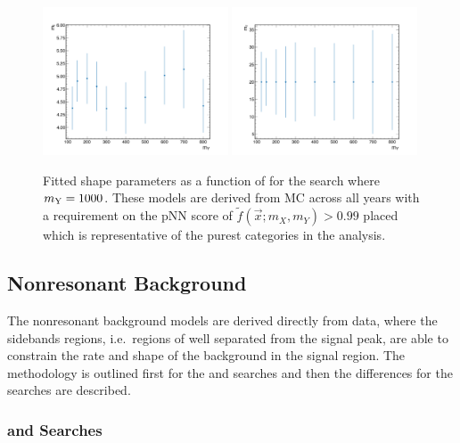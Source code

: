 \begin{figure}
  \includegraphics[width=0.49\textwidth]{Figures/Dihiggs/signal/shape_change/y_gg_high_mass_my_ml.pdf}
  \includegraphics[width=0.49\textwidth]{Figures/Dihiggs/signal/shape_change/y_gg_high_mass_my_mr.pdf} 
  \caption[DCB Shape Parameters as a Function of \mY in the \XYH Searches]{Fitted shape parameters as a function of \mY for the \XYggHtt search where $m_{\mathrm{Y}}=1000$\GeV. These models are derived from MC across all years with a requirement on the pNN score of $\tilde{f}(\vec{x};m_X,m_Y)>0.99$ placed which is representative of the purest categories in the analysis.}\label{fig:shape_change_y_gg_high_mass_my}
\end{figure}

\subsection{Nonresonant Background}\label{sec:non_res_bkg_modelling}

The nonresonant background models are derived directly from data, where the sidebands regions, i.e.\ regions of \mgg well separated from the signal peak, are able to constrain the rate and shape of the background in the signal region. The methodology is outlined first for the \XHH and \XYttHgg searches and then the differences for the \XYggHtt searches are described. 

\subsubsection{\XHH and \XYttHgg Searches}

